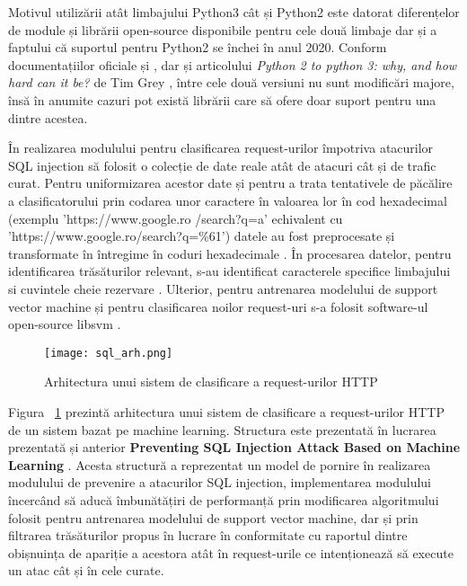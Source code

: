 Motivul utilizării atât limbajului Python3 cât și Python2 este datorat diferențelor de module și librării open-source disponibile pentru cele două limbaje dar și a faptului că suportul pentru Python2 se închei în anul 2020. Conform documentațiilor oficiale  \cite{python3_doc} și \cite{python2_doc}, dar și articolului \textit{Python 2 to python 3: why, and how hard can it be?} de Tim Grey \cite{why_python3},  între cele două versiuni nu sunt modificări majore, însă în anumite cazuri pot există librării care să ofere doar suport pentru una dintre acestea. 

În realizarea modulului pentru clasificarea request-urilor împotriva atacurilor SQL injection să folosit o colecție de date reale atât de atacuri cât și de trafic curat. Pentru uniformizarea acestor date și pentru a trata tentativele de păcălire a clasificatorului prin codarea unor caractere în valoarea lor în cod hexadecimal (exemplu 'https://www.google.ro /search?q=a' echivalent cu 'https://www.google.ro/search?q=\%61') datele au fost preprocesate și transformate în întregime în coduri hexadecimale  \cite{ascii}.  În procesarea datelor, pentru identificarea trăsăturilor relevant, s-au identificat caracterele specifice limbajului \cite{char_sql} si cuvintele cheie rezervare \cite{key_sql}. Ulterior, pentru antrenarea modelului de support vector machine și pentru clasificarea noilor request-uri s-a folosit software-ul open-source libsvm \cite{libsvm_class}. 

\begin{figure}[h]
	\centering
	\texttt{[image: sql\_arh.png]}
	\caption{Arhitectura unui sistem de clasificare a request-urilor HTTP}
	\label{fig:sql-arh}
\end{figure}

Figura ~\ref{fig:sql-arh}  prezintă arhitectura unui sistem de clasificare a request-urilor HTTP de un sistem bazat pe machine learning. Structura este prezentată în lucrarea prezentată și anterior  \textbf{Preventing SQL Injection Attack Based on Machine Learning} \cite{sqli_how}.  Acesta structură a reprezentat un model de pornire în realizarea modulului de prevenire a atacurilor SQL injection, implementarea modulului încercând să aducă îmbunătățiri de performanță prin modificarea algoritmului folosit pentru antrenarea modelului de support vector machine, dar și prin filtrarea trăsăturilor propus în lucrare în conformitate cu raportul dintre obișnuința de apariție a acestora atât în request-urile ce intenționează să execute un atac cât și în cele curate. 

